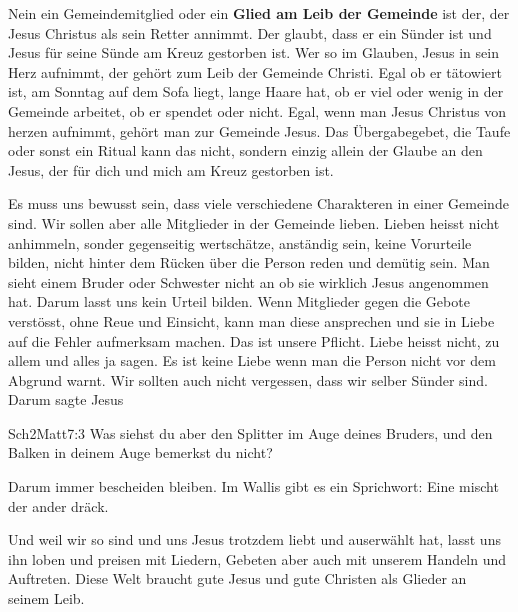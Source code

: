 \documentclass[12pt,a4paper]{scrarticle}
\begin{document}
Nein ein Gemeindemitglied oder ein \textbf{Glied am Leib der Gemeinde} ist der, der Jesus Christus
als sein Retter annimmt. Der glaubt, dass er ein Sünder ist und Jesus für seine Sünde am Kreuz
gestorben ist. Wer so im Glauben, Jesus in sein Herz aufnimmt, der gehört zum Leib der Gemeinde
Christi. Egal ob er tätowiert ist, am Sonntag auf dem Sofa liegt, lange Haare hat, ob er viel oder
wenig in der Gemeinde arbeitet, ob er spendet oder nicht. Egal, wenn man Jesus Christus von
herzen aufnimmt, gehört man zur Gemeinde Jesus. Das Übergabegebet, die Taufe oder sonst ein
Ritual kann das nicht, sondern einzig allein der Glaube an den Jesus, der für dich und mich am
Kreuz gestorben ist.

Es muss uns bewusst sein, dass viele verschiedene Charakteren in einer Gemeinde sind. Wir sollen aber alle Mitglieder in der Gemeinde lieben. Lieben heisst nicht anhimmeln, sonder gegenseitig wertschätze, anständig sein, keine Vorurteile bilden, nicht hinter dem Rücken über die Person reden und demütig sein. Man sieht einem Bruder oder Schwester nicht an ob sie wirklich Jesus angenommen hat. Darum lasst uns kein Urteil bilden. Wenn Mitglieder gegen die Gebote verstösst, ohne Reue und Einsicht, kann man diese ansprechen und sie in Liebe auf die Fehler aufmerksam machen. Das ist unsere Pflicht. Liebe heisst nicht, zu allem und alles ja sagen. Es ist keine Liebe wenn man die Person nicht vor dem Abgrund warnt.
Wir sollten auch nicht vergessen, dass wir selber Sünder sind. Darum sagte Jesus

\begin{bibeltext}{Sch2}{Matt}{7:3}
    Was siehst du aber den Splitter im Auge deines Bruders, und den Balken in deinem
Auge bemerkst du nicht?
\end{bibeltext}

Darum immer bescheiden bleiben. Im Wallis gibt es ein Sprichwort: \glqq{}Eine mischt der ander dräck\grqq.

Und weil wir so sind und uns Jesus trotzdem liebt und auserwählt hat, lasst uns ihn loben und preisen mit Liedern, Gebeten aber auch mit unserem Handeln und Auftreten. Diese Welt braucht gute Jesus und gute Christen als Glieder an seinem Leib.
\end{document}
